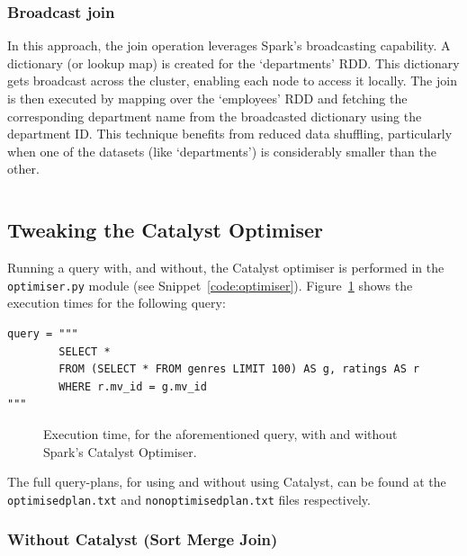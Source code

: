\documentclass[12pt,twoside]{article}
\begin{document}
\subsubsection{Broadcast join}

In this approach, the join operation leverages Spark's broadcasting capability. A dictionary (or lookup map) is created for the `departments' RDD. This dictionary gets broadcast across the cluster, enabling each node to access it locally. The join is then executed by mapping over the `employees' RDD and fetching the corresponding department name from the broadcasted dictionary using the department ID. This technique benefits from reduced data shuffling, particularly when one of the datasets (like `departments') is considerably smaller than the other.

\inputminted[breaklines, breakafter=d, linenos, firstline=42, lastline=71]{python}{./code/joins.py}

\subsection{Tweaking the Catalyst Optimiser}

Running a query with, and without, the Catalyst optimiser is performed in the \texttt{optimiser.py} module (see Snippet~\ref{code:optimiser}). Figure~\ref{fig:optimiser} shows the execution times for the following query:

\begin{verbatim}
query = """
        SELECT *
        FROM (SELECT * FROM genres LIMIT 100) AS g, ratings AS r
        WHERE r.mv_id = g.mv_id
"""
\end{verbatim}

\begin{figure}[htb]
    \centering
    
    \caption{Execution time, for the aforementioned query, with and without Spark's Catalyst Optimiser.}
    \label{fig:optimiser}
\end{figure}

The full query-plans, for using and without using Catalyst, can be found at the \texttt{optimised\textunderscore plan.txt} and \texttt{non\textunderscore optimised\textunderscore plan.txt} files respectively.

\subsubsection{Without Catalyst (Sort Merge Join)}
\end{document}
